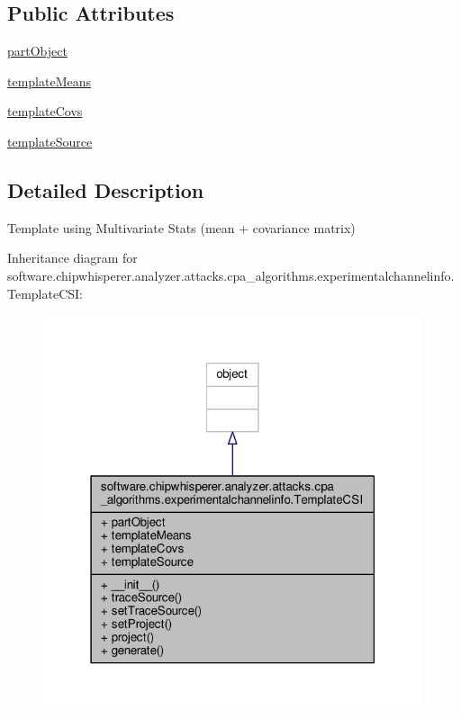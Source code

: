 \subsection*{Public Attributes}
\begin{DoxyCompactItemize}
\item 
\hyperlink{classsoftware_1_1chipwhisperer_1_1analyzer_1_1attacks_1_1cpa__algorithms_1_1experimentalchannelinfo_1_1TemplateCSI_a0579068c536e95394b97a2058fc19969}{part\+Object}
\item 
\hyperlink{classsoftware_1_1chipwhisperer_1_1analyzer_1_1attacks_1_1cpa__algorithms_1_1experimentalchannelinfo_1_1TemplateCSI_a1f09e89afebc386694c44cbf5afcad32}{template\+Means}
\item 
\hyperlink{classsoftware_1_1chipwhisperer_1_1analyzer_1_1attacks_1_1cpa__algorithms_1_1experimentalchannelinfo_1_1TemplateCSI_a5f620487ab4944bd5e0ed564fa2ee1fb}{template\+Covs}
\item 
\hyperlink{classsoftware_1_1chipwhisperer_1_1analyzer_1_1attacks_1_1cpa__algorithms_1_1experimentalchannelinfo_1_1TemplateCSI_a709cffbd6bcca42cb98c020a72e53ce1}{template\+Source}
\end{DoxyCompactItemize}


\subsection{Detailed Description}
\begin{DoxyVerb}Template using Multivariate Stats (mean + covariance matrix)
\end{DoxyVerb}
 

Inheritance diagram for software.\+chipwhisperer.\+analyzer.\+attacks.\+cpa\+\_\+algorithms.\+experimentalchannelinfo.\+Template\+C\+S\+I\+:\nopagebreak
\begin{figure}[H]
\begin{center}
\leavevmode
\includegraphics[width=316pt]{d8/deb/classsoftware_1_1chipwhisperer_1_1analyzer_1_1attacks_1_1cpa__algorithms_1_1experimentalchanneli61a80634e99028f75855696ac8e10d20}
\end{center}
\end{figure}



